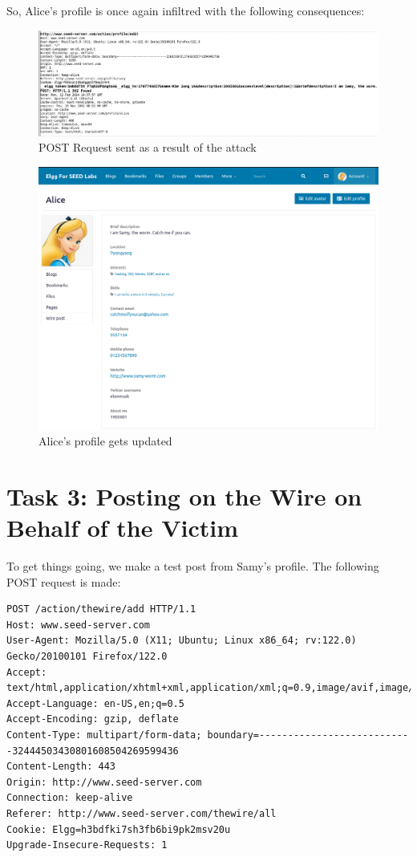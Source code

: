 \documentclass[12pt]{article}
\begin{document}
So, Alice's profile is once again infiltred with the following consequences:
     \begin{figure}[H]
         \centering
         \includegraphics[width=\textwidth]{Images/ss8.png}
         \caption{POST Request sent as a result of the attack}
         \label{fig:ss8}
     \end{figure}
     \begin{figure}[H]
         \centering
         \includegraphics[width=\textwidth]{Images/ss3.png}
         \caption{Alice's profile gets updated}
         \label{fig:ss3}
     \end{figure}

\newpage


\section*{Task 3: Posting on the Wire on Behalf of the Victim}
To get things going, we make a test post from Samy's profile. The following POST request is made:

\begin{verbatim}
POST /action/thewire/add HTTP/1.1
Host: www.seed-server.com
User-Agent: Mozilla/5.0 (X11; Ubuntu; Linux x86_64; rv:122.0) Gecko/20100101 Firefox/122.0
Accept: text/html,application/xhtml+xml,application/xml;q=0.9,image/avif,image/webp,*/*;q=0.8
Accept-Language: en-US,en;q=0.5
Accept-Encoding: gzip, deflate
Content-Type: multipart/form-data; boundary=---------------------------32444503430801608504269599436
Content-Length: 443
Origin: http://www.seed-server.com
Connection: keep-alive
Referer: http://www.seed-server.com/thewire/all
Cookie: Elgg=h3bdfki7sh3fb6bi9pk2msv20u
Upgrade-Insecure-Requests: 1
\end{verbatim}
\end{document}
